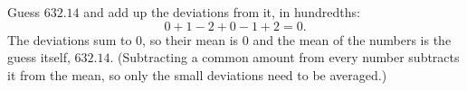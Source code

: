 Guess $632.14$ and add up the deviations from it, in hundredths:
\[
0+1-2+0-1+2=0 .
\]
The deviations sum to $0$, so their mean is $0$ and the mean of the numbers is the guess itself, $\boxed{632.14}$. (Subtracting a common amount from every number subtracts it from the mean, so only the small deviations need to be averaged.)
